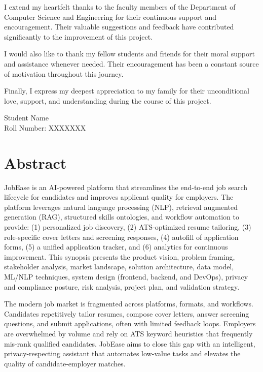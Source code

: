 \documentclass[12pt,a4paper]{report}
\begin{document}
I extend my heartfelt thanks to the faculty members of the Department of Computer Science and Engineering for their continuous support and encouragement. Their valuable suggestions and feedback have contributed significantly to the improvement of this project.

I would also like to thank my fellow students and friends for their moral support and assistance whenever needed. Their encouragement has been a constant source of motivation throughout this journey.

Finally, I express my deepest appreciation to my family for their unconditional love, support, and understanding during the course of this project.

\vspace{2cm}
\begin{flushright}
Student Name\\
Roll Number: XXXXXXX
\end{flushright}

\newpage
\chapter*{Abstract}

JobEase is an AI-powered platform that streamlines the end-to-end job search lifecycle for candidates and improves applicant quality for employers. The platform leverages natural language processing (NLP), retrieval augmented generation (RAG), structured skills ontologies, and workflow automation to provide: (1) personalized job discovery, (2) ATS-optimized resume tailoring, (3) role-specific cover letters and screening responses, (4) autofill of application forms, (5) a unified application tracker, and (6) analytics for continuous improvement. This synopsis presents the product vision, problem framing, stakeholder analysis, market landscape, solution architecture, data model, ML/NLP techniques, system design (frontend, backend, and DevOps), privacy and compliance posture, risk analysis, project plan, and validation strategy.

The modern job market is fragmented across platforms, formats, and workflows. Candidates repetitively tailor resumes, compose cover letters, answer screening questions, and submit applications, often with limited feedback loops. Employers are overwhelmed by volume and rely on ATS keyword heuristics that frequently mis-rank qualified candidates. JobEase aims to close this gap with an intelligent, privacy-respecting assistant that automates low-value tasks and elevates the quality of candidate-employer matches.
\end{document}
